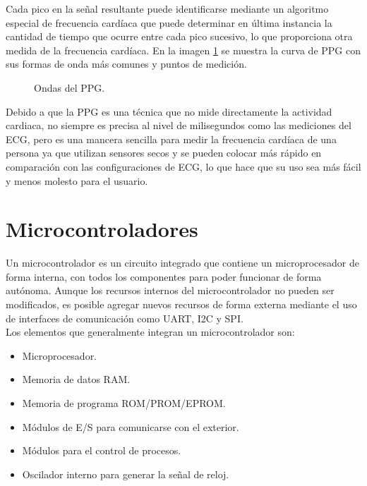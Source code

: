 			Cada pico en la señal resultante puede identificarse mediante un algoritmo especial de frecuencia cardíaca que puede determinar en última instancia la cantidad de tiempo que ocurre entre cada pico sucesivo, lo que proporciona otra medida de la frecuencia cardíaca. En la imagen \ref{fig:PPGwave} se muestra la curva de PPG con sus formas de onda más comunes y puntos de medición. \\
		
		\begin{figure}[htbp!]
			\centering
			\caption{Ondas del PPG.}
			\label{fig:PPGwave}
		\end{figure}
			
			Debido a que la PPG es una técnica que no mide directamente la actividad cardiaca, no siempre es precisa al nivel de milisegundos como las mediciones del ECG, pero es una mancera sencilla para medir la frecuencia cardíaca de una persona ya que utilizan sensores secos y se pueden colocar más rápido en comparación con las configuraciones de ECG, lo que hace que su uso sea más fácil y menos molesto para el usuario. \cite{imotionsECG}
		
	\section{Microcontroladores}
	Un microcontrolador es  un  circuito  integrado  que  contiene  un  microprocesador  de  forma  interna,  con  todos  los  componentes  para  poder  funcionar  de  forma  autónoma. Aunque los recursos internos del microcontrolador no pueden ser modificados, es posible agregar nuevos recursos de forma externa mediante el uso de interfaces de comunicación como UART, I2C y SPI. \cite{garcia2017} \\
	
	Los  elementos  que  generalmente  integran  un  microcontrolador  son:
	\begin{itemize}
		\item Microprocesador.
		\item Memoria  de  datos  RAM.
		\item Memoria  de  programa  ROM/PROM/EPROM.
		\item Módulos  de  E/S  para  comunicarse  con  el  exterior.
		\item Módulos  para  el  control  de  procesos.
		\item Oscilador  interno  para  generar  la  señal  de  reloj.
	\end{itemize}

	